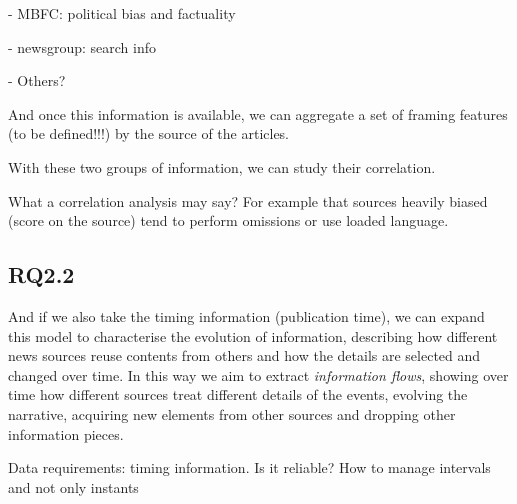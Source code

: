 - MBFC: political bias and factuality

- newsgroup: search info

- Others?

And once this information is available, we can aggregate a set of framing features (to be defined!!!) by the source of the articles.

With these two groups of information, we can study their correlation.

What a correlation analysis may say? For example that sources heavily biased (score on the source) tend to perform omissions or use loaded language.




\subsection{RQ2.2}
And if we also take the timing information (publication time), we can expand this model to characterise the evolution of information, describing how different news sources reuse contents from others and how the details are selected and changed over time.
In this way we aim to extract \textit{information flows}, showing over time how different sources treat different details of the events, evolving the narrative, acquiring new elements from other sources and dropping other information pieces.\textbf{}

Data requirements: timing information.
Is it reliable? How to manage intervals and not only instants







